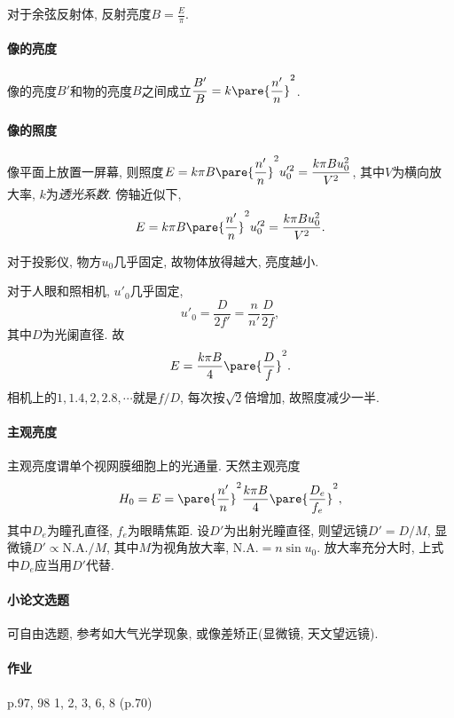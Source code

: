 \documentclass{ctexart}
\begin{document}
对于余弦反射体, 反射亮度$B = \displaystyle \frac{E}{\pi}$.

\paragraph{像的亮度} %
\label{par:像的亮度}

像的亮度$B'$和物的亮度$B$之间成立$\displaystyle \frac{B'}{B} = k\pare{\frac{n'}{n}}^2$.


\paragraph{像的照度} %
\label{par:像的照度}

像平面上放置一屏幕, 则照度$E = k\pi B \displaystyle\pare{\frac{n'}{n}}^2u'^2_0 = \displaystyle \frac{k\pi B u_0^2}{V^2}$, 其中$V$为横向放大率, $k$为\emph{透光系数}. 傍轴近似下,
\[ E = k\pi B\pare{\frac{n'}{n}}^2 u'^2_0 = \frac{k\pi Bu_0^2}{V^2}. \]
\begin{ex}
    对于投影仪, 物方$u_0$几乎固定, 故物体放得越大, 亮度越小.
\end{ex}
\begin{ex}
    对于人眼和照相机, $u'_0$几乎固定,
    \[ u'_0 = \frac{D}{2f'} = \frac{n}{n'}\frac{D}{2f}, \]
    其中$D$为光阑直径. 故
    \[ E = \frac{k\pi B}{4}\pare{\frac{D}{f}}^2. \]
    相机上的$1,1.4,2,2.8,\cdots$就是$f/D$, 每次按$\sqrt{2}$倍增加, 故照度减少一半.
\end{ex}


\paragraph{主观亮度} %
\label{par:主观亮度}

主观亮度谓单个视网膜细胞上的光通量. 天然主观亮度
\[ H_0 = E = \pare{\frac{n'}{n}}^2\frac{k\pi B}{4}\pare{\frac{D_e}{f_e}}^2, \]
其中$D_e$为瞳孔直径, $f_e$为眼睛焦距. 设$D'$为出射光瞳直径, 则望远镜$D' = D/M$, 显微镜$D'\propto \mathrm{N.A.}/M$, 其中$M$为视角放大率, $\mathrm{N.A.} = n\sin u_0$. 放大率充分大时, 上式中$D_e$应当用$D'$代替.





\paragraph{小论文选题} %
\label{par:小论文选题}

可自由选题, 参考如大气光学现象, 或像差矫正(显微镜, 天文望远镜).


\paragraph{作业} %
\label{par:作业}

p.97, 98 1, 2, 3, 6, 8 (p.70)

\end{document}
